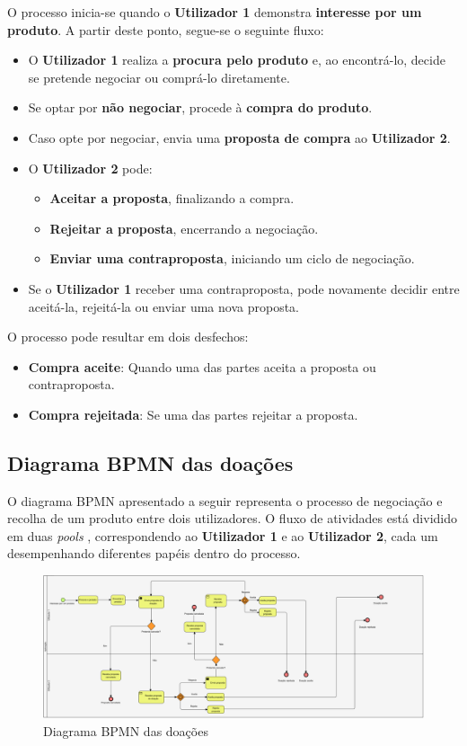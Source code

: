 \documentclass[a4paper, 12pt]{article} %
\begin{document}
O processo inicia-se quando o \textbf{Utilizador 1} demonstra \textbf{interesse por um produto}. A partir deste ponto, segue-se o seguinte fluxo:

\begin{itemize}
	\item O \textbf{Utilizador 1} realiza a \textbf{procura pelo produto} e, ao encontrá-lo, decide se pretende negociar ou comprá-lo diretamente.
	\item Se optar por \textbf{não negociar}, procede à \textbf{compra do produto}.
	\item Caso opte por negociar, envia uma \textbf{proposta de compra} ao \textbf{Utilizador 2}.
	\item O \textbf{Utilizador 2} pode:
	\begin{itemize}
		\item \textbf{Aceitar a proposta}, finalizando a compra.
		\item \textbf{Rejeitar a proposta}, encerrando a negociação.
		\item \textbf{Enviar uma contraproposta}, iniciando um ciclo de negociação.
	\end{itemize}
	\item Se o \textbf{Utilizador 1} receber uma contraproposta, pode novamente decidir entre aceitá-la, rejeitá-la ou enviar uma nova proposta.
\end{itemize}


O processo pode resultar em dois desfechos:
\begin{itemize}
	\item \textbf{Compra aceite}: Quando uma das partes aceita a proposta ou contraproposta.
	\item \textbf{Compra rejeitada}: Se uma das partes rejeitar a proposta.
\end{itemize}

\subsection{Diagrama BPMN das doações}

O diagrama BPMN apresentado a seguir representa o processo de negociação e recolha de um produto entre dois utilizadores. O fluxo de atividades está dividido em duas \textit{pools} , correspondendo ao \textbf{Utilizador 1} e ao \textbf{Utilizador 2}, cada um desempenhando diferentes papéis dentro do processo.

\begin{figure}[ht]
	\centering
	\includegraphics[width=\textwidth]{../images/bpmn-giveaway.png}
	\caption{Diagrama BPMN das doações}
	\label{fig:bpmn giveaway}
\end{figure}
\end{document}
